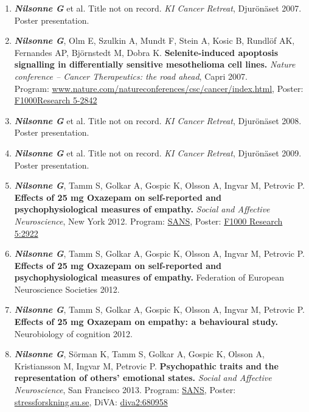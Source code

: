 \documentclass[10pt]{article}
\begin{document}
\begin{enumerate}[nolistsep]
Poster: \href{http://dx.doi.org/10.7490/f1000research.1113573.1}{F1000 Research 5-2921}    
\item \textbf{\textit{Nilsonne G}} et al. Title not on record. \emph{KI Cancer Retreat}, Djurönäset 2007. Poster presentation.
\item \textbf{\textit{Nilsonne G}}, Olm E, Szulkin A, Mundt F, Stein A, Kosic B, Rundlöf AK, Fernandes AP, Björnstedt M, Dobra K. \textbf{Selenite-induced apoptosis signalling in differentially sensitive mesothelioma cell lines.} \emph{Nature conference – Cancer Therapeutics: the road ahead}, Capri 2007.\\
Program: \href{http://www.nature.com/natureconferences/csc/cancer/index.html}{www.nature.com/natureconferences/csc/cancer/index.html},
Poster: \href{http://dx.doi.org/10.7490/f1000research.1113515.1}{F1000Research 5-2842}
\item \textbf{\textit{Nilsonne G}} et al. Title not on record. \emph{KI Cancer Retreat}, Djurönäset 2008. Poster presentation.
\item \textbf{\textit{Nilsonne G}} et al. Title not on record. \emph{KI Cancer Retreat}, Djurönäset 2009. Poster presentation.
\item \textbf{\textit{Nilsonne G}}, Tamm S, Golkar A, Gospic K, Olsson A, Ingvar M, Petrovic P. \textbf{Effects of 25 mg Oxazepam on self-reported and psychophysiological measures of empathy.} \emph{Social and Affective Neuroscience}, New York 2012.
Program: \href{http://www.socialaffectiveneuro.org/documents/SANS_program_2012.pdf}{SANS},
Poster: \href{http://dx.doi.org/10.7490/f1000research.1113574.1}{F1000 Research 5:2922}
\item \textbf{\textit{Nilsonne G}}, Tamm S, Golkar A, Gospic K, Olsson A, Ingvar M, Petrovic P. \textbf{Effects of 25 mg Oxazepam on self-reported and psychophysiological measures of empathy.} Federation of European Neuroscience Societies 2012.
\item \textbf{\textit{Nilsonne G}}, Tamm S, Golkar A, Gospic K, Olsson A, Ingvar M, Petrovic P. \textbf{Effects of 25 mg Oxazepam on empathy: a behavioural study.} Neurobiology of cognition 2012.
\item \textbf{\textit{Nilsonne G}}, Sörman K, Tamm S, Golkar A, Gospic K, Olsson A, Kristiansson M, Ingvar M, Petrovic P. \textbf{Psychopathic traits and the representation of others’ emotional states.} \emph{Social and Affective Neuroscience}, San Francisco 2013.
Program: \href{http://www.socialaffectiveneuro.org/documents/SANS_program_2013.pdf}{SANS}, Poster: \href{http://www.stressforskning.su.se/polopoly_fs/1.238724.1433421432!/menu/standard/file/Gustav\%202.pdf}{stressforskning.su.se}, DiVA: \href{http://www.diva-portal.org/smash/record.jsf?pid=diva2\%3A680958\&dswid=-8130}{diva2:680958}

\end{enumerate}
\end{document}
